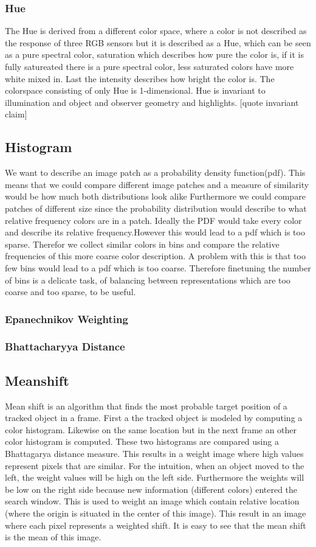 \documentclass[a4paper,11pt]{article}
\begin{document}
\subsubsection{Hue}
		The Hue is derived from a different color space, where a color is not described as the response of three RGB sensors but it is described as a Hue, which can be seen as a pure spectral color, saturation which describes how pure the color is, if it is fully satureated there is a pure spectral color, less saturated colors have more white mixed in. Last the intensity describes how bright the color is. 
		The colorspace consisting of only Hue is 1-dimensional.
		Hue is invariant to illumination and object and observer geometry and highlights. [quote invariant claim]
\subsection{Histogram}
		We want to describe an image patch as a probability density function(pdf). This means that we could compare different image patches and a measure of similarity would be how much both distributions look alike %
		Furthermore we could compare patches of different size since the probability distribution would describe to what relative frequency colors are in a patch.
		Ideally the PDF  would take every color and describe its relative frequency.However this would lead to a pdf which is too sparse. Therefor we collect similar colors in bins and compare the relative frequencies of this more coarse color description. A problem with this is that too few bins would lead to a pdf which is too coarse. Therefore finetuning the number of bins is a delicate task, of balancing between representations which are too coarse and too sparse, to be useful. 
\subsubsection{Epanechnikov Weighting}
\subsubsection{Bhattacharyya Distance}
		
\subsection{Meanshift}
Mean shift is an algorithm that finds the most probable target position of a tracked object in a frame. First a the tracked object is modeled by computing a color histogram. Likewise on the same location but in the next frame an other color histogram is computed. These two histograms are compared using a Bhattagarya distance measure. This results in a weight image where high values represent pixels that are similar.  For the intuition, when an object moved to the left, the weight values will be high on the left side. Furthermore the weights will be low on the right side because new information (different colors) entered the search window. 
This is used to weight an image which contain relative location (where the origin is situated in the center of this image). This result in an image where each pixel represents a weighted shift. It is easy to see that the mean shift is the mean of this image.
\end{document}
